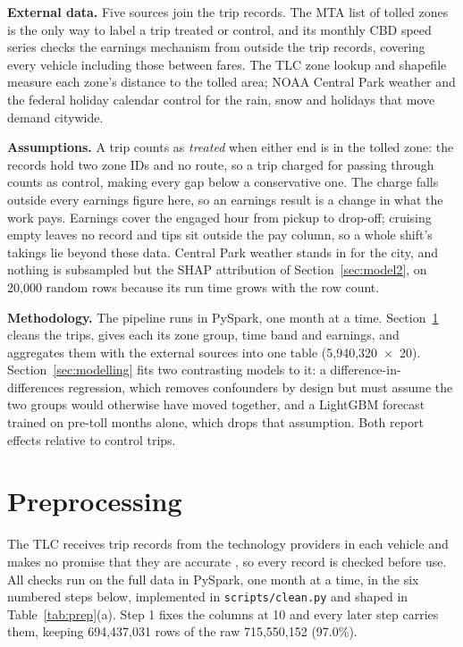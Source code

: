 \documentclass[11pt]{article}
\begin{document}
\textbf{External data.} Five sources join the trip records. The MTA list of tolled zones \cite{mtacbdzones} is the only way to label a trip treated or control, and its monthly CBD speed series \cite{mtacbdspeeds} checks the earnings mechanism from outside the trip records, covering every vehicle including those between fares. The TLC zone lookup and shapefile \cite{tlczones} measure each zone's distance to the tolled area; NOAA Central Park weather \cite{noaaghcnd} and the federal holiday calendar \cite{opmholidays} control for the rain, snow and holidays that move demand citywide.

\textbf{Assumptions.} A trip counts as \emph{treated} when either end is in the tolled zone: the records hold two zone IDs and no route, so a trip charged for passing through counts as control, making every gap below a conservative one. The charge falls outside every earnings figure here, so an earnings result is a change in what the work pays. Earnings cover the engaged hour from pickup to drop-off; cruising empty leaves no record and tips sit outside the pay column, so a whole shift's takings lie beyond these data. Central Park weather stands in for the city, and nothing is subsampled but the SHAP attribution of Section~\ref{sec:model2}, on 20,000 random rows because its run time grows with the row count.

\textbf{Methodology.} The pipeline runs in PySpark, one month at a time. Section~\ref{sec:preprocessing} cleans the trips, gives each its zone group, time band and earnings, and aggregates them with the external sources into one table (5,940,320~$\times$~20). Section~\ref{sec:modelling} fits two contrasting models to it: a difference-in-differences regression, which removes confounders by design but must assume the two groups would otherwise have moved together, and a LightGBM forecast trained on pre-toll months alone, which drops that assumption. Both report effects relative to control trips.

\section{Preprocessing}
\label{sec:preprocessing}
The TLC receives trip records from the technology providers in each vehicle and makes no promise that they are accurate \cite{tlctripdata}, so every record is checked before use. All checks run on the full data in PySpark, one month at a time, in the six numbered steps below, implemented in \texttt{scripts/clean.py} and shaped in Table~\ref{tab:prep}(a). Step 1 fixes the columns at 10 and every later step carries them, keeping 694,437,031 rows of the raw 715,550,152 (97.0\%).
\end{document}
